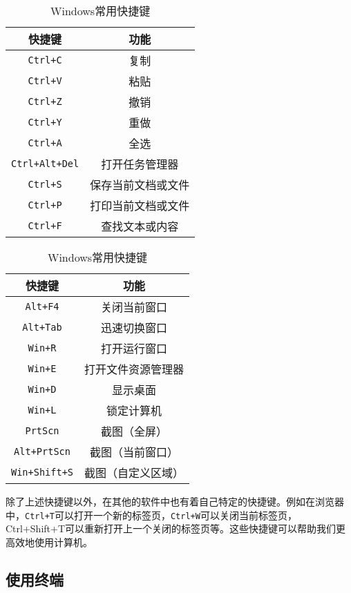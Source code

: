 \begin{table}[ht]
  \centering
  \caption{Windows常用快捷键}
  \label{tab:windows-shortcuts}
  \begin{tabular}[t]{c|c}
    \hline
    \textbf{快捷键} & \textbf{功能} \\
    \hline
    \texttt{Ctrl+C} & 复制 \\
    \texttt{Ctrl+V} & 粘贴 \\
    \texttt{Ctrl+Z} & 撤销 \\
    \texttt{Ctrl+Y} & 重做 \\
    \texttt{Ctrl+A} & 全选 \\
    \texttt{Ctrl+Alt+Del} & 打开任务管理器 \\
    \texttt{Ctrl+S} & 保存当前文档或文件 \\
    \texttt{Ctrl+P} & 打印当前文档或文件 \\
    \texttt{Ctrl+F} & 查找文本或内容 \\
    \hline
  \end{tabular}
  \qquad
  \begin{tabular}[t]{c|c}
    \hline
    \textbf{快捷键} & \textbf{功能} \\
    \hline
    \texttt{Alt+F4} & 关闭当前窗口 \\
    \texttt{Alt+Tab} & 迅速切换窗口 \\
    \texttt{Win+R} & 打开运行窗口 \\
    \texttt{Win+E} & 打开文件资源管理器 \\
    \texttt{Win+D} & 显示桌面 \\
    \texttt{Win+L} & 锁定计算机 \\
    \texttt{PrtScn} & 截图（全屏） \\
    \texttt{Alt+PrtScn} & 截图（当前窗口） \\
    \texttt{Win+Shift+S} & 截图（自定义区域） \\
    \hline
  \end{tabular}
\end{table}

除了上述快捷键以外，在其他的软件中也有着自己特定的快捷键。例如在浏览器中，\texttt{Ctrl+T}可以打开一个新的标签页，\texttt{Ctrl+W}可以关闭当前标签页，Ctrl+Shift+T可以重新打开上一个关闭的标签页等。这些快捷键可以帮助我们更高效地使用计算机。

\subsection{使用终端}\label{sec:terminal}

